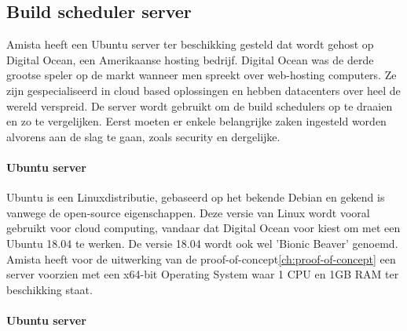         \subsection{Build scheduler server}
        Amista heeft een Ubuntu server ter beschikking gesteld dat wordt gehost op Digital Ocean, een Amerikaanse hosting bedrijf. Digital Ocean was de derde grootse speler op de markt wanneer men spreekt over web-hosting computers. Ze zijn gespecialiseerd in cloud based oplossingen en hebben datacenters over heel de wereld verspreid. De server wordt gebruikt om de build schedulers op te draaien en zo te vergelijken. Eerst moeten er enkele belangrijke zaken ingesteld worden alvorens aan de slag te gaan, zoals security en dergelijke.
            
            \paragraph{Ubuntu server}
            Ubuntu is een Linuxdistributie, gebaseerd op het bekende Debian en gekend is vanwege de open-source eigenschappen.
            Deze versie van Linux wordt vooral gebruikt voor cloud computing, vandaar dat Digital Ocean voor kiest om met een Ubuntu 18.04 te werken.
            De versie 18.04 wordt ook wel 'Bionic Beaver' genoemd.
            Amista heeft voor de uitwerking van de proof-of-concept\ref{ch:proof-of-concept} een server voorzien met een x64-bit Operating System waar 1 CPU en 1GB RAM ter beschikking staat.
            
            \paragraph{Ubuntu server}
%            
            
